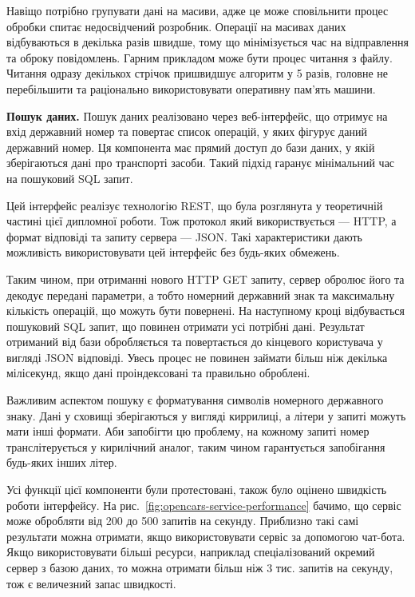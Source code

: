 Навіщо потрібно групувати дані на масиви,
адже це може сповільнити процес обробки спитає недосвідчений розробник.
Операції на масивах даних відбуваються в декілька разів швидше, тому що мінімізується час на відправлення та оброку повідомлень.
Гарним прикладом може бути процес читання з файлу.
Читання одразу декількох стрічок пришвидшує алгоритм у 5 разів,
головне не перебільшити та раціонально використовувати оперативну пам'ять машини.

\textbf{Пошук даних.}
Пошук даних реалізовано через веб-інтерфейс, що отримує на вхід державний номер та
повертає список операцій, у яких фігурує даний державний номер.
Ця компонента має прямий доступ до бази даних, у якій зберігаються дані про транспорті засоби.
Такий підхід гаранує мінімальний час на пошуковий SQL запит.

Цей інтерфейс реалізує технологію REST, що була розглянута у теоретичній частині цієї дипломної роботи.
Тож протокол який використвується — HTTP, а формат відповіді та запиту сервера — JSON.
Такі характеристики дають можливість використовувати
цей інтерфейс без будь-яких обмежень.

Таким чином, при отриманні нового HTTP GET запиту, сервер обролює його та декодує
передані параметри, а тобто номерний державний знак та максимальну кількість операцій, що можуть бути повернені.
На наступному кроці відбувається пошуковий SQL запит, що повинен отримати усі потрібні дані.
Результат отриманий від бази обробляється та повертається до кінцевого користувача у вигляді JSON відповіді.
Увесь процес не повинен займати більш ніж декілька мілісекунд,
якщо дані проіндексовані та правильно оброблені.

Важливим аспектом пошуку є форматування символів номерного державного знаку.
Дані у сховищі зберігаються у вигляді киррилиці, а літери у запиті можуть мати інші формати.
Аби запобігти цю проблему, на кожному запиті номер транслітерується у кирилічний аналог,
таким чином гарантується запобігання будь-яких інших літер.

Усі функції цієї компоненти були протестовані, також було оцінено швидкість роботи інтерфейсу.
На рис.~\ref{fig:opencars-service-performance} бачимо,
що сервіс може обробляти від 200 до 500 запитів на секунду.
Приблизно такі самі результати можна отримати,
якщо використовувати сервіс за допомогою чат-бота.
Якщо використовувати більші ресурси, наприклад спеціалізований
окремий сервер з базою даних, то можна отримати більш ніж
3 тис. запитів на секунду, тож є величезний запас швидкості.

